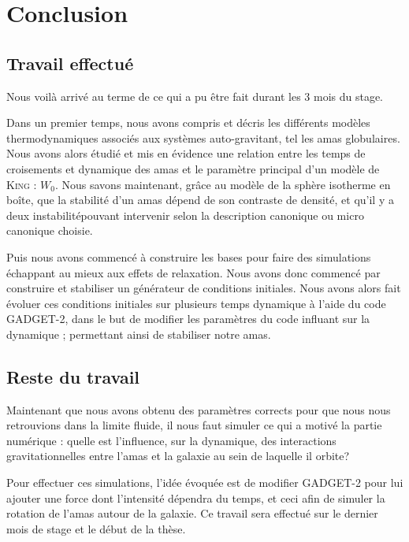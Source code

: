 \documentclass[a4paper,11pt,twoside,openright]{report}
\renewcommand{\(}{\ensuremath{\left(}}
\renewcommand{\)}{\ensuremath{\right)}}
\begin{document}
		\chapter*{Conclusion}
			\section*{Travail effectué}
				Nous voilà arrivé au terme de ce qui a pu être fait durant les 3 mois du stage.

				Dans un premier temps, nous avons compris et décris les différents modèles thermodynamiques associés aux systèmes auto-gravitant, tel les amas globulaires.
				Nous avons alors étudié et mis en évidence une relation entre les temps de croisements et dynamique des amas et le paramètre principal d'un modèle de \textsc{King} : $W_0$. Nous savons maintenant,
				grâce au modèle de la sphère isotherme en boîte, que la stabilité d'un amas dépend de son contraste de densité, et qu'il y a deux instabilitépouvant intervenir selon la description canonique ou
				micro canonique choisie.

				Puis nous avons commencé à construire les bases pour faire des simulations échappant au mieux aux effets de relaxation. Nous avons donc commencé par construire et stabiliser un générateur de
				conditions initiales.
				Nous avons alors fait évoluer ces conditions initiales sur plusieurs temps dynamique à l'aide du code \textsc{GADGET-2}, dans le but de modifier les paramètres du code influant sur la dynamique ; permettant ainsi de stabiliser notre amas.

			\section*{Reste du travail}
				Maintenant que nous avons obtenu des paramètres corrects pour que nous nous retrouvions dans la limite fluide, il nous faut simuler ce qui a motivé la partie numérique : quelle est l'influence, sur la
				dynamique, des interactions gravitationnelles entre l'amas et la galaxie au sein de laquelle il orbite?

				Pour effectuer ces simulations, l'idée évoquée est de modifier \textsc{GADGET-2} pour lui ajouter une force dont l'intensité dépendra du temps, et ceci afin de simuler la rotation de l'amas autour de la galaxie.
				Ce travail sera effectué sur le dernier mois de stage et le début de la thèse.
\end{document}
